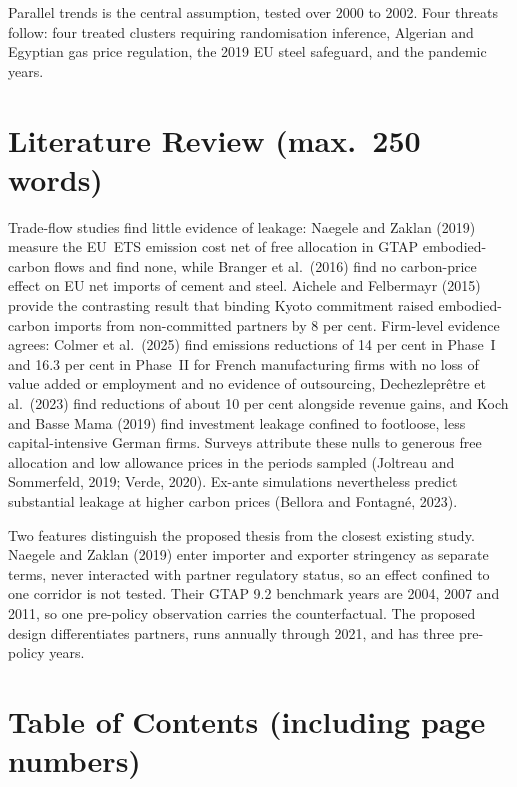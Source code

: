 \documentclass[12pt,a4paper]{article}
\begin{document}
Parallel trends is the central assumption, tested over 2000 to 2002. Four threats follow: four treated clusters requiring randomisation inference, Algerian and Egyptian gas price regulation, the 2019 EU steel safeguard, and the pandemic years.

\section{Literature Review (max.\ 250 words)}

Trade-flow studies find little evidence of leakage: Naegele and Zaklan (2019) measure the EU~ETS emission cost net of free allocation in GTAP embodied-carbon flows and find none, while Branger et al.\ (2016) find no carbon-price effect on EU net imports of cement and steel. Aichele and Felbermayr (2015) provide the contrasting result that binding Kyoto commitment raised embodied-carbon imports from non-committed partners by 8 per cent. Firm-level evidence agrees: Colmer et al.\ (2025) find emissions reductions of 14 per cent in Phase~I and 16.3 per cent in Phase~II for French manufacturing firms with no loss of value added or employment and no evidence of outsourcing, Dechezlepr\^{e}tre et al.\ (2023) find reductions of about 10 per cent alongside revenue gains, and Koch and Basse Mama (2019) find investment leakage confined to footloose, less capital-intensive German firms. Surveys attribute these nulls to generous free allocation and low allowance prices in the periods sampled (Joltreau and Sommerfeld, 2019; Verde, 2020). Ex-ante simulations nevertheless predict substantial leakage at higher carbon prices (Bellora and Fontagn\'{e}, 2023).

Two features distinguish the proposed thesis from the closest existing study. Naegele and Zaklan (2019) enter importer and exporter stringency as separate terms, never interacted with partner regulatory status, so an effect confined to one corridor is not tested. Their GTAP 9.2 benchmark years are 2004, 2007 and 2011, so one pre-policy observation carries the counterfactual. The proposed design differentiates partners, runs annually through 2021, and has three pre-policy years.

\section{Table of Contents (including page numbers)}
\end{document}

